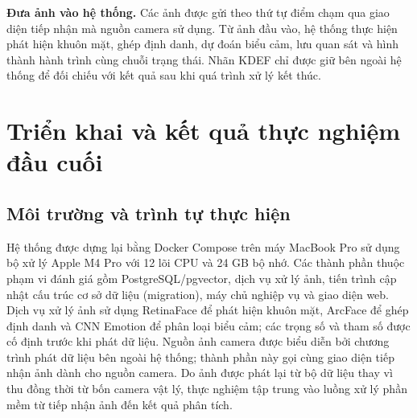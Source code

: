 \documentclass[../LuanVan.tex]{subfiles}
\begin{document}
\textbf{Đưa ảnh vào hệ thống.} Các ảnh được gửi theo thứ tự điểm chạm qua giao diện tiếp nhận mà nguồn camera sử dụng. Từ ảnh đầu vào, hệ thống thực hiện phát hiện khuôn mặt, ghép định danh, dự đoán biểu cảm, lưu quan sát và hình thành hành trình cùng chuỗi trạng thái. Nhãn KDEF chỉ được giữ bên ngoài hệ thống để đối chiếu với kết quả sau khi quá trình xử lý kết thúc.

\section{Triển khai và kết quả thực nghiệm đầu cuối}
\label{section:5.4}

\subsection{Môi trường và trình tự thực hiện}
\label{subsection:5.4.1}

Hệ thống được dựng lại bằng Docker Compose trên máy MacBook Pro sử dụng bộ xử lý Apple M4 Pro với 12 lõi CPU và 24 GB bộ nhớ. Các thành phần thuộc phạm vi đánh giá gồm PostgreSQL/pgvector, dịch vụ xử lý ảnh, tiến trình cập nhật cấu trúc cơ sở dữ liệu (migration), máy chủ nghiệp vụ và giao diện web. Dịch vụ xử lý ảnh sử dụng RetinaFace để phát hiện khuôn mặt, ArcFace để ghép định danh và CNN Emotion để phân loại biểu cảm; các trọng số và tham số được cố định trước khi phát dữ liệu. Nguồn ảnh camera được biểu diễn bởi chương trình phát dữ liệu bên ngoài hệ thống; thành phần này gọi cùng giao diện tiếp nhận ảnh dành cho nguồn camera. Do ảnh được phát lại từ bộ dữ liệu thay vì thu đồng thời từ bốn camera vật lý, thực nghiệm tập trung vào luồng xử lý phần mềm từ tiếp nhận ảnh đến kết quả phân tích.

\begin{table}[H]
    \centering
    \caption{Môi trường triển khai tại thời điểm thực nghiệm đầu cuối}
    \label{tab:deployment_environment_ch5}
\end{table}
\end{document}
